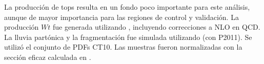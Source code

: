 La producción de tops resulta en un fondo poco importante para este análisis,
aunque de mayor importancia para las regiones de control y validación. La producción $Wt$
fue generada utilizando {\powheg}, incluyendo correcciones a NLO en QCD. La lluvia
partónica y la fragmentación fue simulada utilizando {\pythia} (con P2011).
Se utilizó el conjunto de PDFs CT10. Las muestras fueron normalizadas con
la sección eficaz calculada en \cite{Kidonakis:2010ux}.


